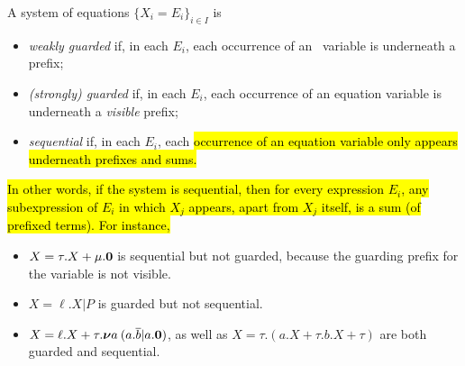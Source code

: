 


\begin{definition}
\label{def:guardness}
A system of equations 
$\{  X_i = E_i\}_{i\in I}$
 is 
\begin{itemize}
\item \emph{weakly guarded} if, in each $E_i$, each occurrence of
  an \behav\  variable is underneath a prefix;

\item \emph{(strongly) guarded} if, in each $E_i$, each occurrence of
  an equation variable is underneath a \emph{visible} prefix;

\item \emph{sequential} if, in each $E_i$, each \hl{occurrence of an
    equation variable only appears underneath prefixes and sums.}
\end{itemize}
\end{definition}

\hl{In other words, if the system is sequential, then for
every expression $E_i$, any subexpression of $E_i$ in which $X_j $
appears, apart from $X_j$ itself, is a sum (of prefixed terms).
For instance,}
\begin{itemize}
\item $X = \tau. X + \mu . {\boldsymbol 0}$ is sequential but not 
 guarded, because the guarding prefix for the variable
is not visible.

\item $X =  \ell . X | P$ is guarded but not sequential.

\item $X =  \ell . X + \tau. {\boldsymbol \nu} a\: (a .\overline{b} | a.{\boldsymbol 0})$, as well as
$X = \tau . (a. X + \tau . b .X + \tau  )$ are both guarded and sequential.
\end{itemize}

